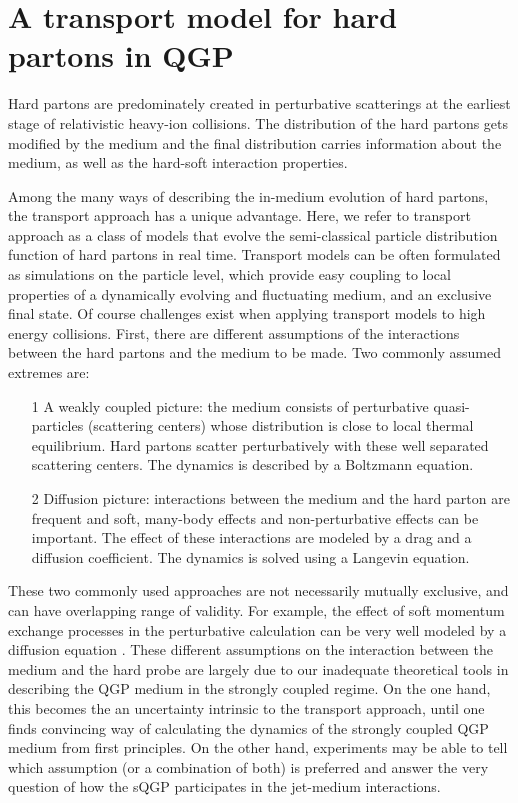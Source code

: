 \chapter{A transport model for hard partons in QGP}
\label{chapter:transport}
Hard partons are predominately created in perturbative scatterings at the earliest stage of relativistic heavy-ion collisions.
The distribution of the hard partons gets modified by the medium and the final distribution carries information about the medium, as well as the hard-soft interaction properties.

Among the many ways of describing the in-medium evolution of hard partons, 
the transport approach has a unique advantage. 
Here, we refer to transport approach as a class of models that evolve the semi-classical particle distribution function of hard partons in real time.
Transport models can be often formulated as simulations on the particle level, which provide easy coupling to local properties of a dynamically evolving and fluctuating medium, and an exclusive final state.
Of course challenges exist when applying transport models to high energy collisions.
First, there are different assumptions of the interactions between the hard partons and the medium to be made.
Two commonly assumed extremes are:
\begin{itemize}
\item[1] A weakly coupled picture: the medium consists of perturbative quasi-particles (scattering centers) whose distribution is close to local thermal equilibrium.
Hard partons scatter perturbatively with these well separated scattering centers. The dynamics is described by a Boltzmann equation.
\item[2] Diffusion picture: interactions between the medium and the hard parton are frequent and soft, many-body effects and non-perturbative effects can be important. The effect of these interactions are modeled by a drag and a diffusion coefficient. The dynamics is solved using a Langevin equation.
\end{itemize}
These two commonly used approaches are not necessarily mutually exclusive, and can have overlapping range of validity. 
For example, the effect of soft momentum exchange processes in the perturbative calculation can be very well modeled by a diffusion equation \cite{Ghiglieri:2015ala,Dai:2019hbi}.
These different assumptions on the interaction between the medium and the hard probe are largely due to our inadequate theoretical tools in describing the QGP medium in the strongly coupled regime.
On the one hand, this becomes the an uncertainty intrinsic to the transport approach, until one finds convincing way of calculating the dynamics of the strongly coupled QGP medium from first principles.
On the other hand, experiments may be able to tell which assumption (or a combination of both) is preferred and answer the very question of how the sQGP participates in the jet-medium interactions.

